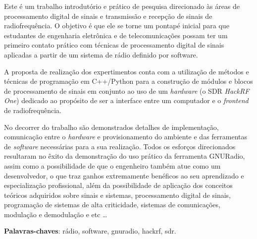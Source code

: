 \documentclass[
  12pt,				%
  openright,			%
  twoside,			%
  a4paper,			%
  english,			%
  french,				%
  spanish,			%
  brazil,				%
  ]{abntex2}
\begin{document}

\setlength{\absparsep}{18pt} %
\begin{resumo}

  Este é um trabalho introdutório e prático de pesquisa direcionado às áreas de processamento digital de sinais e transmissão e recepção de sinais de radiofrequência.
  O objetivo é que ele se torne um pontapé inicial para que estudantes de engenharia eletrônica e de telecomunicações possam ter um primeiro contato prático com
  técnicas de processamento digital de sinais aplicadas a partir de um sistema de rádio definido por software.

  A proposta de realização dos expertimentos conta com a  utilização de métodos e técnicas de programação em C++/Python para a construção de módulos e blocos de processamento
  de sinais em conjunto ao uso de um \textit{hardware} (o SDR \textit{HackRF One}) dedicado ao propósito de ser a interface entre um computador e o \textit{frontend} de radiofrequência.

  No decorrer do trabalho são demonstrados detalhes de implementação, comunicação entre o \textit{hardware} e provisionamento do ambiente e das ferramentas de
  \textit{software} necessárias para a sua realização. Todos os esforços direcionados resultaram no êxito da demonstração do uso prático da ferramenta GNURadio, assim como
  a possibilidade de que o engenheiro também atue como um desenvolvedor, o que traz ganhos extremamente benéficos ao seu aprendizado e especialização profissional, além da
  possibilidade de aplicação dos conceitos teóricos adquiridos sobre sinais e sistemas, processamento digital de sinais, programação de sistemas de alta criticidade, sistemas
  de comunicações, modulação e demodulação e etc \ldots

  \noindent
  \textbf{Palavras-chaves}: rádio, software, gnuradio, hackrf, sdr.
\end{resumo}

\end{document}
